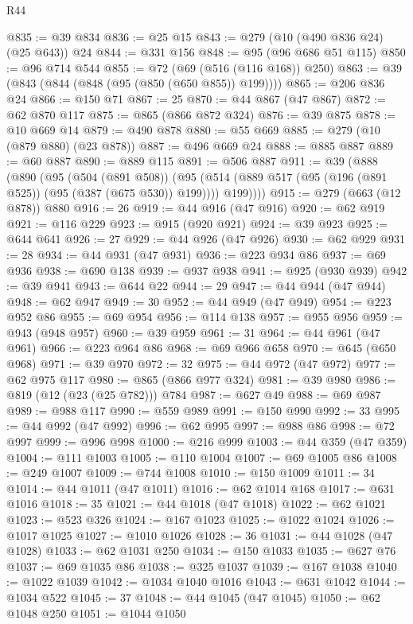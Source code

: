 \begin{lexlean}{R44}
\begin{coremodule}
@835 := @39 @834
@836 := @25 @15
@843 := @279 (@10 (@490 @836 @24) (@25 @643)) @24
@844 := @331 @156
@848 := @95 (@96 @686 @51 @115)
@850 := @96 @714 @544
@855 := @72 (@69 (@516 (@116 @168)) @250)
@863 := @39 (@843 (@844 (@848 (@95 (@850 (@650 @855)) @199))))
@865 := @206 @836 @24
@866 := @150 @71
@867 := 25
@870 := @44 @867 (@47 @867)
@872 := @62 @870 @117
@875 := @865 (@866 @872 @324)
@876 := @39 @875
@878 := @10 @669 @14
@879 := @490 @878
@880 := @55 @669
@885 := @279 (@10 (@879 @880) (@23 @878))
@887 := @496 @669 @24
@888 := @885 @887
@889 := @60 @887
@890 := @889 @115
@891 := @506 @887
@911 := @39
    (@888
      (@890
        (@95
          (@504 (@891 @508))
          (@95 (@514 (@889 @517 (@95 (@196 (@891 @525)) (@95 (@387 (@675 @530)) @199)))) @199))))
@915 := @279 (@663 (@12 @878)) @880
@916 := 26
@919 := @44 @916 (@47 @916)
@920 := @62 @919
@921 := @116 @229
@923 := @915 (@920 @921)
@924 := @39 @923
@925 := @644 @641
@926 := 27
@929 := @44 @926 (@47 @926)
@930 := @62 @929
@931 := 28
@934 := @44 @931 (@47 @931)
@936 := @223 @934 @86
@937 := @69 @936
@938 := @690 @138
@939 := @937 @938
@941 := @925 (@930 @939)
@942 := @39 @941
@943 := @644 @22
@944 := 29
@947 := @44 @944 (@47 @944)
@948 := @62 @947
@949 := 30
@952 := @44 @949 (@47 @949)
@954 := @223 @952 @86
@955 := @69 @954
@956 := @114 @138
@957 := @955 @956
@959 := @943 (@948 @957)
@960 := @39 @959
@961 := 31
@964 := @44 @961 (@47 @961)
@966 := @223 @964 @86
@968 := @69 @966 @658
@970 := @645 (@650 @968)
@971 := @39 @970
@972 := 32
@975 := @44 @972 (@47 @972)
@977 := @62 @975 @117
@980 := @865 (@866 @977 @324)
@981 := @39 @980
@986 := @819 (@12 (@23 (@25 @782))) @784
@987 := @627 @49
@988 := @69 @987
@989 := @988 @117
@990 := @559 @989
@991 := @150 @990
@992 := 33
@995 := @44 @992 (@47 @992)
@996 := @62 @995
@997 := @988 @86
@998 := @72 @997
@999 := @996 @998
@1000 := @216 @999
@1003 := @44 @359 (@47 @359)
@1004 := @111 @1003
@1005 := @110 @1004
@1007 := @69 @1005 @86
@1008 := @249 @1007
@1009 := @744 @1008
@1010 := @150 @1009
@1011 := 34
@1014 := @44 @1011 (@47 @1011)
@1016 := @62 @1014 @168
@1017 := @631 @1016
@1018 := 35
@1021 := @44 @1018 (@47 @1018)
@1022 := @62 @1021
@1023 := @523 @326
@1024 := @167 @1023
@1025 := @1022 @1024
@1026 := @1017 @1025
@1027 := @1010 @1026
@1028 := 36
@1031 := @44 @1028 (@47 @1028)
@1033 := @62 @1031 @250
@1034 := @150 @1033
@1035 := @627 @76
@1037 := @69 @1035 @86
@1038 := @325 @1037
@1039 := @167 @1038
@1040 := @1022 @1039
@1042 := @1034 @1040 @1016
@1043 := @631 @1042
@1044 := @1034 @522
@1045 := 37
@1048 := @44 @1045 (@47 @1045)
@1050 := @62 @1048 @250
@1051 := @1044 @1050

\end{coremodule}
\end{lexlean}
